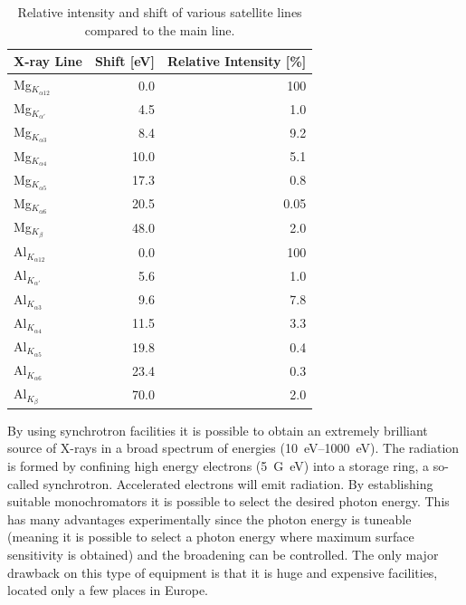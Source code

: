 \begin{table}
\begin{center}
\caption{Relative intensity and shift of various satellite lines compared to the main line.}\label{tab:satlines}
\begin{tabular} {|l|r|r|} \hline
          X-ray Line & Shift [\si{\electronvolt}] & Relative Intensity [\si{\percent}]\\ \hline
          Mg$_{K_{\alpha 12}}$ & 0.0 & 100 \\ \hline Mg$_{K_{\alpha
          '}}$ & 4.5 & 1.0 \\ \hline Mg$_{K_{\alpha 3}}$ & 8.4 & 9.2 \\
          \hline Mg$_{K_{\alpha 4}}$ & 10.0 & 5.1 \\ \hline
          Mg$_{K_{\alpha 5}}$ & 17.3 & 0.8 \\ \hline Mg$_{K_{\alpha
          6}}$ & 20.5 & 0.05 \\ \hline Mg$_{K_{\beta}}$ & 48.0 & 2.0
          \\ \hline
          Al$_{K_{\alpha 12}}$ & 0.0 & 100  \\ \hline Al$_{K_{\alpha '}}$ &
          5.6 & 1.0  \\ \hline Al$_{K_{\alpha 3}}$ & 9.6 & 7.8  \\
          \hline Al$_{K_{\alpha 4}}$ & 11.5 & 3.3  \\ \hline
          Al$_{K_{\alpha 5}}$ & 19.8 & 0.4  \\ \hline Al$_{K_{\alpha
          6}}$ & 23.4 & 0.3  \\ \hline Al$_{K_{\beta}}$ & 70.0 & 2.0  \\
          \hline
\end{tabular}
\end{center}
\end{table}

By using synchrotron facilities it is possible to obtain an extremely brilliant source of X-rays in a broad spectrum of energies (\SIrange{10}{1000}{\electronvolt}). The radiation is formed by confining high energy electrons (\SI{5}{G\electronvolt}) into a storage ring, a so-called synchrotron. Accelerated electrons will emit radiation. By establishing suitable  monochromators it is possible to select the desired photon energy. This has many advantages experimentally since the photon energy is tuneable (meaning it is possible to select a photon energy where maximum surface sensitivity is obtained)  and the broadening can be controlled. The  only major drawback on this type of equipment is that it is huge and  expensive facilities, located only a few places in Europe.

